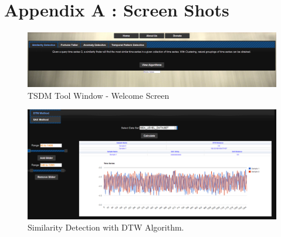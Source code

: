 \documentclass[12pt,a4paper]{report}
\begin{document}
\section*{Appendix A : Screen Shots}
\begin{figure}[h!]

  \centering
    \includegraphics[scale=0.35]{./screenshots/welcome_screen.png}
  \caption{TSDM Tool Window - Welcome Screen}
\end{figure}

\begin{figure}[h!]
  
  \centering
    \includegraphics[scale=0.35]{./screenshots/sim_dtw.png}
\caption{Similarity Detection with DTW Algorithm.}
\end{figure}
\end{document}
